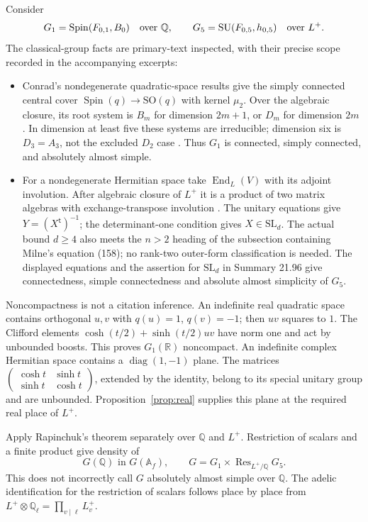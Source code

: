 \documentclass[11pt]{article}
\newcommand{\Q}{\mathbb Q}
\newcommand{\R}{\mathbb R}
\newcommand{\Spin}{\operatorname{Spin}}
\newcommand{\SU}{\operatorname{SU}}
\begin{document}
Consider
\[
 G_1=\Spin(F_{0,1},B_0)\quad\hbox{over }\Q,\qquad
 G_5=\SU(F_{0,5},h_{0,5})\quad\hbox{over }L^+.
 \]
The classical-group facts are primary-text inspected, with their
precise scope recorded in the accompanying excerpts:
\begin{itemize}
\item Conrad's nondegenerate quadratic-space results give the
simply connected central cover \(\Spin(q)\to\mathrm{SO}(q)\)
with kernel \(\mu_2\). Over the algebraic closure, its root
system is \(B_m\) for dimension \(2m+1\), or \(D_m\) for
dimension \(2m\) \cite[C.3.10, C.4.1, C.4.10]{conrad}.
In dimension at least five these systems are irreducible;
dimension six is \(D_3=A_3\), not the excluded \(D_2\) case
\cite[C.6.6]{conrad}. Thus \(G_1\) is connected, simply
connected, and absolutely almost simple.
\item For a nondegenerate Hermitian space take
\(\operatorname{End}_L(V)\) with its adjoint involution.
After algebraic closure of \(L^+\) it is a product of two matrix
algebras with exchange-transpose involution
\cite[24.40(b)]{milne}.
The unitary equations give \(Y=(X^{\mathsf t})^{-1}\);
the determinant-one condition gives \(X\in\mathrm{SL}_d\).
The actual bound \(d\ge4\) also meets the \(n>2\) heading of
the subsection containing Milne's equation (158); no rank-two
outer-form classification is needed. The displayed equations
and the assertion for \(\mathrm{SL}_d\) in Summary 21.96 give connectedness,
simple connectedness and absolute almost simplicity of \(G_5\).
\end{itemize}
Noncompactness is not a citation inference. An indefinite real
quadratic space contains orthogonal \(u,v\) with \(q(u)=1\),
\(q(v)=-1\); then \(uv\) squares to \(1\).
The Clifford elements
\(\cosh(t/2)+\sinh(t/2)uv\) have norm one and act by
unbounded boosts. This proves \(G_1(\R)\) noncompact.
An indefinite complex Hermitian space contains a
\(\operatorname{diag}(1,-1)\) plane. The matrices
\(\left(\begin{smallmatrix}\cosh t&\sinh t\\
\sinh t&\cosh t\end{smallmatrix}\right)\), extended by the identity,
belong to its special unitary group and are unbounded.
Proposition~\ref{prop:real} supplies this plane at the required
real place of \(L^+\).

Apply Rapinchuk's theorem separately over \(\Q\) and \(L^+\).
Restriction of scalars and a finite product give density of
\[
 G(\Q)\text{ in }G(\mathbb A_f),\qquad
 G=G_1\times\operatorname{Res}_{L^+/\Q}G_5.                     \tag{24}
\]
This does not incorrectly call \(G\) absolutely almost simple
over \(\Q\). The adelic identification for the restriction of
scalars follows place by place from
\(L^+\otimes\Q_\ell=\prod_{v\mid\ell}L^+_v\).
\end{document}
